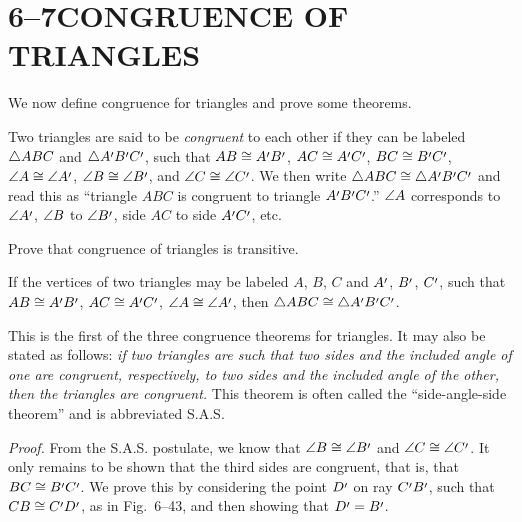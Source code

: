\documentclass[11pt]{book}
\begin{document}
\section*{6--7\quad CONGRUENCE OF TRIANGLES}

We now define congruence for triangles and prove some theorems.

\begin{definition}
Two triangles are said to be \emph{congruent} to each other if they can be
labeled $\triangle ABC$ and $\tri{A\VIpr B\VIpr C\VIpr}$, such that
$AB \cong A\VIpr B\VIpr$, $AC \cong A\VIpr C\VIpr$, $BC \cong B\VIpr C\VIpr$,
$\ang{A} \cong \ang{A\VIpr}$, $\ang{B} \cong \ang{B\VIpr}$, and $\ang{C} \cong
\ang{C\VIpr}$. We then write $\tri{ABC} \cong \tri{A\VIpr B\VIpr C\VIpr}$ and
read this as ``triangle $ABC$ is congruent to triangle $A\VIpr B\VIpr
C\VIpr$.'' $\angle A$ corresponds to $\ang{A\VIpr}$, $\angle B$ to
$\ang{B\VIpr}$, side $AC$ to side $A\VIpr C\VIpr$, etc.
\end{definition}

Prove that congruence of triangles is transitive.

\begin{theorem}
If the vertices of two triangles may be labeled $A$, $B$, $C$ and $A\VIpr$,
$B\VIpr$, $C\VIpr$, such that $AB \cong A\VIpr B\VIpr$, $AC \cong A\VIpr
C\VIpr$, $\ang{A} \cong \ang{A\VIpr}$, then $\tri{ABC} \cong \tri{A\VIpr
B\VIpr C\VIpr}$.
\end{theorem}

\begin{remark}
This is the first of the three congruence theorems for triangles. It may also
be stated as follows: \emph{if two triangles are such that two sides and the
included angle of one are congruent, respectively, to two sides and the
included angle of the other, then the triangles are congruent.} This theorem
is often called the ``side-angle-side theorem'' and is abbreviated S.A.S.
\end{remark}

\emph{Proof.} From the S.A.S. postulate, we know that $\ang{B} \cong
\ang{B\VIpr}$ and $\ang{C} \cong \ang{C\VIpr}$. It only remains to be shown
that the third sides are congruent, that is, that $BC \cong B\VIpr C\VIpr$. We
prove this by considering the point $D\VIpr$ on ray $C\VIpr B\VIpr$, such that
$CB \cong C\VIpr D\VIpr$, as in Fig.~6--43, and then showing that $D\VIpr =
B\VIpr$.
\end{document}
